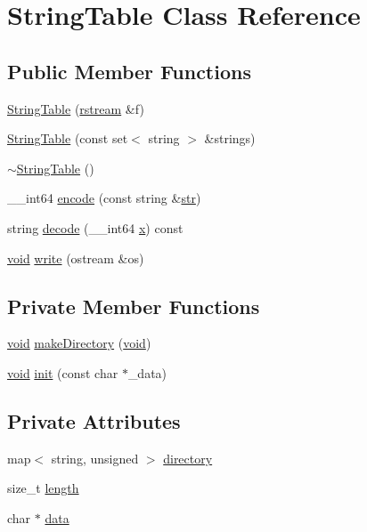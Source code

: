 \hypertarget{classStringTable}{\section{String\-Table Class Reference}
\label{classStringTable}
}
\subsection*{Public Member Functions}
\begin{DoxyCompactItemize}
\item 
\hyperlink{classStringTable_a7b1d10b164ac537427f69b8f74e82f0e}{String\-Table} (\hyperlink{classrstream}{rstream} \&f)
\item 
\hyperlink{classStringTable_a3cfd042bd8bc8cdbd7605239483ab6f0}{String\-Table} (const set$<$ string $>$ \&strings)
\item 
\hyperlink{classStringTable_a1772239d39a3e9c1a190774d827c276a}{$\sim$\-String\-Table} ()
\item 
\-\_\-\-\_\-int64 \hyperlink{classStringTable_a8974f81180f04c03f4e7a6f96d3a6859}{encode} (const string \&\hyperlink{kmp__ftn__os_8h_a8269f97b2652fc717949a982d7b4f02a}{str})
\item 
string \hyperlink{classStringTable_a4c854682a6ad18571c5c982463623ea3}{decode} (\-\_\-\-\_\-int64 \hyperlink{ittnotify__static_8h_a25eb27b280775b27a5ddc4d1673225aa}{x}) const 
\item 
\hyperlink{ittnotify__static_8h_af941d56e55e3c5465135b60c4d6343ed}{void} \hyperlink{classStringTable_a5723e0a1a205d8ec1efaf4ee831eda6f}{write} (ostream \&os)
\end{DoxyCompactItemize}
\subsection*{Private Member Functions}
\begin{DoxyCompactItemize}
\item 
\hyperlink{ittnotify__static_8h_af941d56e55e3c5465135b60c4d6343ed}{void} \hyperlink{classStringTable_a21adcf6465a0ee5cdd803bb01a1340d6}{make\-Directory} (\hyperlink{ittnotify__static_8h_af941d56e55e3c5465135b60c4d6343ed}{void})
\item 
\hyperlink{ittnotify__static_8h_af941d56e55e3c5465135b60c4d6343ed}{void} \hyperlink{classStringTable_a23dbfe4ddeb01a618c0680da9891c88c}{init} (const char $\ast$\-\_\-data)
\end{DoxyCompactItemize}
\subsection*{Private Attributes}
\begin{DoxyCompactItemize}
\item 
map$<$ string, unsigned $>$ \hyperlink{classStringTable_aae367f0869109a838ade94339db9eb2d}{directory}
\item 
size\-\_\-t \hyperlink{classStringTable_a0990f0196e8550c5040393f30888eb61}{length}
\item 
char $\ast$ \hyperlink{classStringTable_a5f15a003fff4c6086ab9b8888daee316}{data}
\end{DoxyCompactItemize}


